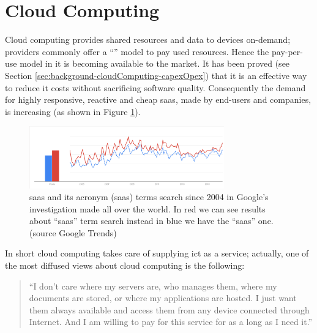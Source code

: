 %
%
\section{Cloud Computing}
\label{sec:background-cloudComputing}
Cloud computing provides shared resources and data to devices on-demand; providers commonly offer a 
``'' model to pay used resources. Hence the pay-per-use model
in \acs{it} is becoming available to the market. It has been proved (see Section
\ref{sec:background-cloudComputing-capexOpex}) that it is an effective way to reduce \acs{it} costs
without sacrificing software quality. Consequently the demand for highly responsive, reactive and cheap
\ac{saas}, made by end-users and companies, is increasing (as shown in Figure
\ref{img:background-cloudComputing-saasInterest}).
 
\begin{figure}
	\centering{}
 	\includegraphics[width=0.75\textwidth]{chapters/background/images/saas-interest.png}
 	\caption[Trends in searching ``\acs{saas}'' on Google]{\acf{saas} and its acronym (\acs{saas})
 		terms search since 2004 in Google's investigation made all over the world. In red we can see
 		results about ``\acs{saas}'' term search instead in blue we have the ``\acf{saas}'' one. 
 		(\footnotesize{source	Google Trends}\normalsize{)}}
 	\label{img:background-cloudComputing-saasInterest}
\end{figure}

In short cloud computing takes care of supplying \ac{ict} as a service; actually, one of the most diffused
views about cloud computing is the following:

\begin{center}
	\begin{quote}
		``I don’t care where my servers are, who manages them, where my documents are stored, or where my
		applications are hosted. I just want them always available and access them from any device connected
		through Internet. And I am willing to pay for this service for as a long as I need it.''
	\end{quote}
\end{center}

